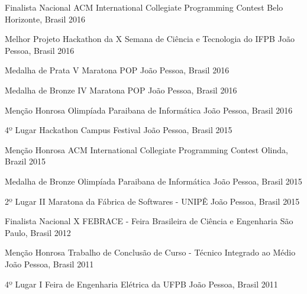 \begin{cvhonors}
  
  \cvhonor
    {Finalista Nacional} %
    {ACM International Collegiate Programming Contest} %
    {Belo Horizonte, Brasil} %
    {2016} %
  
  \cvhonor
    {Melhor Projeto} %
    {Hackathon da X Semana de Ciência e Tecnologia do IFPB} %
    {João Pessoa, Brasil} %
    {2016} %
  
  \cvhonor
    {Medalha de Prata} %
    {V Maratona POP} %
    {João Pessoa, Brasil} %
    {2016} %
  
  \cvhonor
    {Medalha de Bronze} %
    {IV Maratona POP} %
    {João Pessoa, Brasil} %
    {2016} %
  
  \cvhonor
    {Menção Honrosa} %
    {Olimpíada Paraibana de Informática} %
    {João Pessoa, Brasil} %
    {2016} %
  
  \cvhonor
    {4º Lugar} %
    {Hackathon Campus Festival} %
    {João Pessoa, Brasil} %
    {2015} %
  
  \cvhonor
    {Menção Honrosa} %
    {ACM International Collegiate Programming Contest} %
    {Olinda, Brazil} %
    {2015} %
  
  \cvhonor
    {Medalha de Bronze} %
    {Olimpíada Paraibana de Informática} %
    {João Pessoa, Brasil} %
    {2015} %
  
  \cvhonor
    {2º Lugar} %
    {II Maratona da Fábrica de Softwares - UNIPÊ} %
    {João Pessoa, Brasil} %
    {2015} %
  
  \cvhonor
    {Finalista Nacional} %
    {X FEBRACE - Feira Brasileira de Ciência e Engenharia} %
    {São Paulo, Brasil} %
    {2012} %
  
  \cvhonor
    {Menção Honrosa} %
    {Trabalho de Conclusão de Curso - Técnico Integrado ao Médio} %
    {João Pessoa, Brasil} %
    {2011} %
  
  \cvhonor
    {4º Lugar} %
    {I Feira de Engenharia Elétrica da UFPB} %
    {João Pessoa, Brasil} %
    {2011} %
\end{cvhonors}
